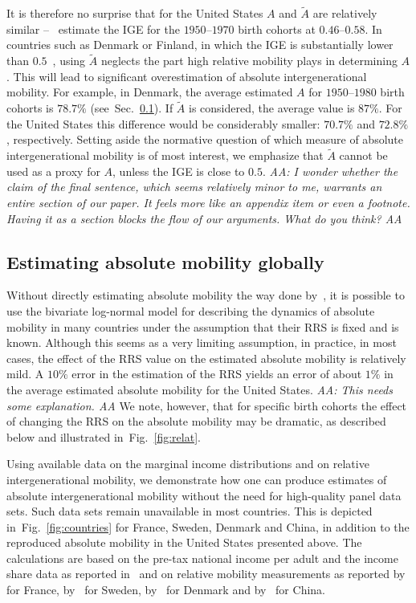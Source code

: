 \documentclass[12pt,a4paper]{article}
\newcommand{\red}[1]{{\color{red} #1}}
\newcommand{\sref}[1]{Sec.~\ref{sec:#1}}
\newcommand{\AAA}[1]{\red{{\it AA: #1 AA}}}
\newcommand{\fref}[1]{Fig.~\ref{fig:#1}}
\numberwithin{equation}{section}
\begin{document}
It is therefore no surprise that for the United States $A$ and $\tilde{A}$ are relatively similar --~\citet{aaronson2008intergenerational} estimate the IGE for the $1950$--$1970$ birth cohorts at $0.46$--$0.58$. In countries such as Denmark or Finland, in which the IGE is substantially lower than $0.5$~\citep{corak2013income}, using $\tilde{A}$ neglects the part high relative mobility plays in determining $A$. This will lead to significant overestimation of absolute intergenerational mobility. For example, in Denmark, the average estimated $A$ for $1950$--$1980$ birth cohorts is $78.7\%$ (see~\sref{global}). If $\tilde{A}$ is considered, the average value is $87\%$. For the United States this difference would be considerably smaller: $70.7\%$ and $72.8\%$, respectively. Setting aside the normative question of which measure of absolute intergenerational mobility is of most interest, we emphasize that $\tilde{A}$ cannot be used as a proxy for $A$, unless the IGE is close to $0.5$. \AAA{I wonder whether the claim of the final sentence, which seems relatively minor to me, warrants an entire section of our paper. It feels more like an appendix item or even a footnote. Having it as a section blocks the flow of our arguments. What do you think?}

\subsection{Estimating absolute mobility globally}
\label{sec:global}

Without directly estimating absolute mobility the way done by~\citet{chetty2017fading}, it is possible to use the bivariate log-normal model for describing the dynamics of absolute mobility in many countries under the assumption that their RRS is fixed and is known. Although this seems as a very limiting assumption, in practice, in most cases, the effect of the RRS value on the estimated absolute mobility is relatively mild. A $10\%$ error in the estimation of the RRS yields an error of about $1\%$ in the average estimated absolute mobility for the United States. \AAA{This needs some explanation.} We note, however, that for specific birth cohorts the effect of changing the RRS on the absolute mobility may be dramatic, as described below and illustrated in~\fref{relat}.

Using available data on the marginal income distributions and on relative intergenerational mobility, we demonstrate how one can produce estimates of absolute intergenerational mobility without the need for high-quality panel data sets. Such data sets remain unavailable in most countries. This is depicted in~\fref{countries} for France, Sweden, Denmark and China, in addition to the reproduced absolute mobility in the United States presented above. The calculations are based on the pre-tax national income per adult and the income share data as reported in~\citet{WID2017} and on relative mobility measurements as reported by~\citet{lefranc2005intergenerational} for France, by~\citet{bjorklund1997intergenerational} for Sweden, by~\citet{landerso2016scandinavian} for Denmark and by~\citet{fan2015great} for China.
\end{document}

